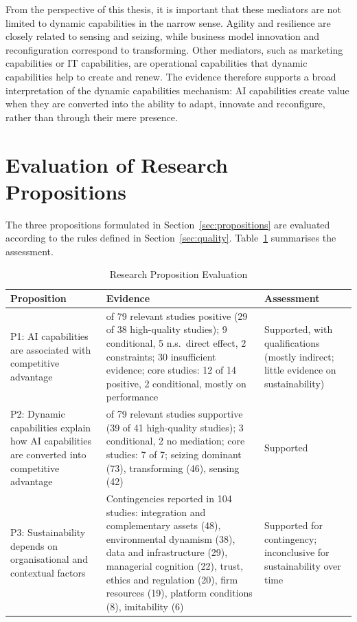 From the perspective of this thesis, it is important that these mediators are not limited to dynamic capabilities in the narrow sense. Agility and resilience are closely related to sensing and seizing, while business model innovation and reconfiguration correspond to transforming. Other mediators, such as marketing capabilities or IT capabilities, are operational capabilities that dynamic capabilities help to create and renew. The evidence therefore supports a broad interpretation of the dynamic capabilities mechanism: AI capabilities create value when they are converted into the ability to adapt, innovate and reconfigure, rather than through their mere presence.

\section{Evaluation of Research Propositions}
\label{sec:proposition-evaluation}

The three propositions formulated in Section~\ref{sec:propositions} are evaluated according to the rules defined in Section~\ref{sec:quality}. Table~\ref{tab:propositions} summarises the assessment.

\begin{table}[H]
  \centering
  \caption{Research Proposition Evaluation}
  \label{tab:propositions}
  \small{}\sloppy
  \begin{tabularx}{\textwidth}{>{\raggedright\arraybackslash}p{2.3cm}>{\raggedright\arraybackslash}X>{\raggedright\arraybackslash}p{2.8cm}}
    \toprule
    \textbf{Proposition} & \textbf{Evidence} & \textbf{Assessment} \\
    \midrule
    P1: AI capabilities are associated with competitive advantage & 63 of 79 relevant studies positive (29 of 38 high-quality studies); 9 conditional, 5 n.s.\ direct effect, 2 constraints; 30 insufficient evidence; core studies: 12 of 14 positive, 2 conditional, mostly on performance & Supported, with qualifications (mostly indirect; little evidence on sustainability) \\
    \addlinespace
    P2: Dynamic capabilities explain how AI capabilities are converted into competitive advantage & 74 of 79 relevant studies supportive (39 of 41 high-quality studies); 3 conditional, 2 no mediation; core studies: 7 of 7; seizing dominant (73), transforming (46), sensing (42) & Supported \\
    \addlinespace
    P3: Sustainability depends on organisational and contextual factors & Contingencies reported in 104 studies: integration and complementary assets (48), environmental dynamism (38), data and infrastructure (29), managerial cognition (22), trust, ethics and regulation (20), firm resources (19), platform conditions (8), imitability (6) & Supported for contingency; inconclusive for sustainability over time \\
    \bottomrule
  \end{tabularx}
\end{table}

